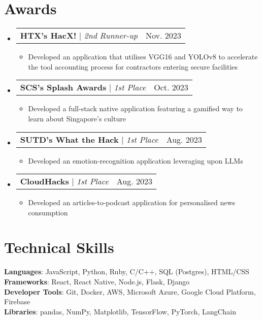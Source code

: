 \documentclass[letterpaper,11pt]{article}
\makeatletter
\newcommand{\resumeItem}[1]{
  \item\small{
    {#1 \vspace{-2pt}}
  }
}
\newcommand{\resumeProjectHeading}[2]{
    \item
    \begin{tabular*}{0.97\textwidth}{l@{\extracolsep{\fill}}r}
      \small#1 & #2 \\
    \end{tabular*}\vspace{-7pt}
}
\newcommand{\resumeSubHeadingListStart}{\begin{itemize}[leftmargin=0.15in, label={}]}
\newcommand{\resumeSubHeadingListEnd}{\end{itemize}}
\newcommand{\resumeItemListStart}{\begin{itemize}}
\newcommand{\resumeItemListEnd}{\end{itemize}\vspace{-5pt}}
\makeatother
\begin{document}
\section{Awards}
    \resumeSubHeadingListStart
      \resumeProjectHeading
          {\textbf{HTX's HacX!} $|$ \emph{2nd Runner-up}}{Nov. 2023}
          \resumeItemListStart
            \resumeItem{Developed an application that utilises VGG16 and YOLOv8 to accelerate the tool accounting process for contractors entering secure facilities}
          \resumeItemListEnd
      \resumeProjectHeading
          {\textbf{SCS’s Splash Awards} $|$ \emph{1st Place}}{Oct. 2023}
          \resumeItemListStart
            \resumeItem{Developed a full-stack native application featuring a gamified way to learn about Singapore’s culture}
          \resumeItemListEnd
      \resumeProjectHeading
          {\textbf{SUTD's What the Hack} $|$ \emph{1st Place}}{Aug. 2023}
          \resumeItemListStart
            \resumeItem{Developed an emotion-recognition application leveraging upon LLMs}
          \resumeItemListEnd
      \resumeProjectHeading
          {\textbf{CloudHacks} $|$ \emph{1st Place}}{Aug. 2023}
          \resumeItemListStart
            \resumeItem{Developed an articles-to-podcast application for personalised news consumption}
          \resumeItemListEnd
    \resumeSubHeadingListEnd



%
\section{Technical Skills}
 \begin{itemize}[leftmargin=0.15in, label={}]
    \small{\item{
     \textbf{Languages}{: JavaScript, Python, Ruby, C/C++, SQL (Postgres), HTML/CSS} \\
     \textbf{Frameworks}{: React, React Native, Node.js, Flask, Django} \\
     \textbf{Developer Tools}{: Git, Docker, AWS, Microsoft Azure, Google Cloud Platform, Firebase} \\
     \textbf{Libraries}{: pandas, NumPy, Matplotlib, TensorFlow, PyTorch, LangChain}
    }}
 \end{itemize}


\end{document}
